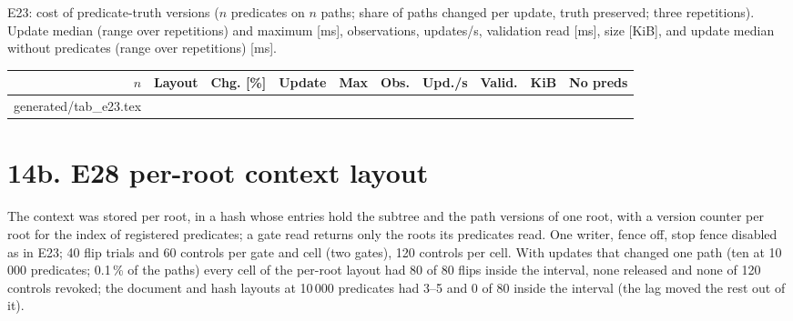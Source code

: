 \documentclass[11pt]{article}
\makeatletter
\newcommand{\gen}[1]{\@@input generated/#1.tex }
\makeatother
\begin{document}
E23: cost of predicate-truth versions ($n$ predicates on $n$ paths; share of paths changed per update, truth preserved; three repetitions). Update median (range over repetitions) and maximum [ms], observations, updates/s, validation read [ms], size [KiB], and update median without predicates (range over repetitions) [ms].
\begin{center}
\footnotesize
\setlength{\tabcolsep}{3.5pt}
\begin{tabular}{@{}rlrrrrrrrr@{}}
\toprule
$n$ & \textbf{Layout} & \textbf{Chg. [\%]} & \textbf{Update} & \textbf{Max} & \textbf{Obs.} & \textbf{Upd./s} & \textbf{Valid.} & \textbf{KiB} & \textbf{No preds} \\
\midrule
\gen{tab_e23}
\bottomrule
\end{tabular}
\end{center}

\section*{14b. E28 per-root context layout}
The context was stored per root, in a hash whose entries hold the subtree and the path versions of one root, with a version counter per root for the index of registered predicates; a gate read returns only the roots its predicates read. One writer, fence off, stop fence disabled as in E23; 40 flip trials and 60 controls per gate and cell (two gates), 120 controls per cell. With updates that changed one path (ten at 10\,000 predicates; 0.1\,\% of the paths) every cell of the per-root layout had 80 of 80 flips inside the interval, none released and none of 120 controls revoked; the document and hash layouts at 10\,000 predicates had 3--5 and 0 of 80 inside the interval (the lag moved the rest out of it).
\end{document}
